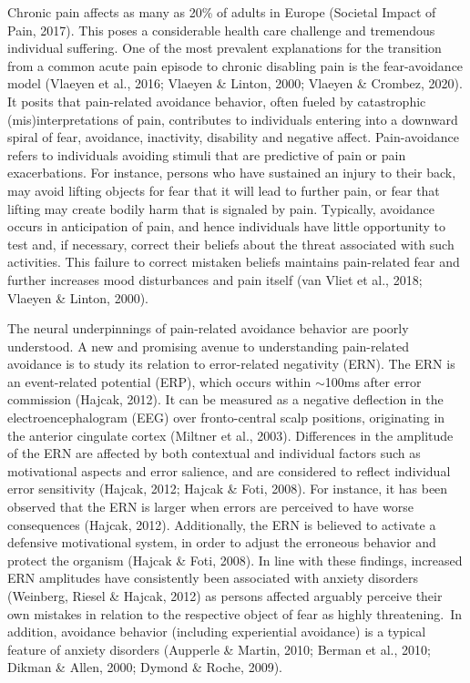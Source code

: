 \documentclass[twocolumn, serif, authordate, review]{jote-article}
\begin{document}
\noindent Chronic pain affects as many as 20\% of adults in Europe (Societal Impact of Pain, 2017). This poses a considerable health care challenge and tremendous individual suffering. One of the most prevalent explanations for the transition from a common acute pain episode to chronic disabling pain is the fear-avoidance model (Vlaeyen et al., 2016; Vlaeyen \& Linton, 2000; Vlaeyen \& Crombez, 2020). It posits that pain-related avoidance behavior, often fueled by catastrophic (mis)interpretations of pain, contributes to individuals entering into a downward spiral of fear, avoidance, inactivity, disability and negative affect. Pain-avoidance refers to individuals avoiding stimuli that are predictive of pain or pain exacerbations. For instance, persons who have sustained an injury to their back, may avoid lifting objects for fear that it will lead to further pain, or fear that lifting may create bodily harm that is signaled by pain. Typically, avoidance occurs in anticipation of pain, and hence individuals have little opportunity to test and, if necessary, correct their beliefs about the threat associated with such activities. This failure to correct mistaken beliefs maintains pain-related fear and further increases mood disturbances and pain itself (van Vliet et al., 2018; Vlaeyen \& Linton, 2000).~

The neural underpinnings of pain-related avoidance behavior are poorly understood. A new and promising avenue to understanding pain-related avoidance is to study its relation to error-related negativity (ERN). The ERN is an event-related potential (ERP), which occurs within $\mathrm{\sim}$100ms after error commission (Hajcak, 2012). It can be measured as a negative deflection in the electroencephalogram (EEG) over fronto-central scalp positions, originating in the anterior cingulate cortex (Miltner et al., 2003). Differences in the amplitude of the ERN are affected by both contextual and individual factors such as motivational aspects and error salience, and are considered to reflect individual error sensitivity (Hajcak, 2012; Hajcak \& Foti, 2008). For instance, it has been observed that the ERN is larger when errors are perceived to have worse consequences (Hajcak, 2012). Additionally, the ERN is believed to activate a defensive motivational system, in order to adjust the erroneous behavior and protect the organism (Hajcak \& Foti, 2008). In line with these findings, increased ERN amplitudes have consistently been associated with anxiety disorders (Weinberg, Riesel \& Hajcak, 2012) as persons affected arguably perceive their own mistakes in relation to the respective object of fear as highly threatening.~In addition, avoidance behavior (including experiential avoidance) is a typical feature of anxiety disorders (Aupperle \& Martin, 2010; Berman et al., 2010; Dikman \& Allen, 2000; Dymond \& Roche, 2009).
\end{document}
